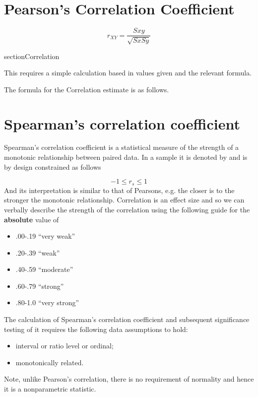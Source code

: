 \documentclass[]{report}
\begin{document}
\section{Pearson's Correlation Coefficient}
\[ r_{XY} = \frac{Sxy}{\sqrt{SxSy}} \]

section{Correlation}

This requires a simple calculation based in values given and the relevant formula.

The formula for the Correlation estimate is as follows.



\section{Spearman’s correlation coefficient }

Spearman’s correlation coefficient is a statistical measure of the strength of a 
monotonic relationship between paired data. In a sample it is denoted by 
and is by 
design constrained as follows 

\[ -1 \leq r_s \leq 1 \]
And its interpretation is similar to that of Pearsons, e.g. the closer 
is to the stronger the monotonic relationship. Correlation is an effect size and so we can verbally describe the strength of the correlation using the following guide for the 
\textbf{absolute} value of 

\begin{itemize}
	\item .00-.19 “very weak” 
	\item .20-.39 “weak” 
	\item .40-.59 “moderate” 
	\item .60-.79 “strong” 
	\item .80-1.0 “very strong” 
\end{itemize}

The calculation of Spearman’s correlation coefficient and subsequent significance 
testing of it requires the following data assumptions to hold: 

\begin{itemize}
	\item interval or ratio level or ordinal; 
	\item monotonically related. 
\end{itemize}

Note, unlike Pearson’s correlation, there is no requirement of normality and hence it 
is a nonparametric statistic. 
\end{document}
